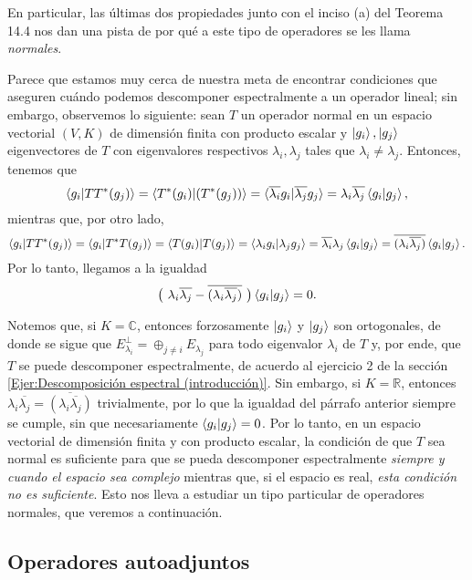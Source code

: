 \documentclass[12pt,dvipsnames]{article}
\begin{document}
En particular, las últimas dos propiedades junto con el inciso (a) del Teorema 14.4 nos dan una pista de por qué a este tipo de operadores se les llama \emph{normales}.

\vspace{3mm}
Parece que estamos muy cerca de nuestra meta de encontrar condiciones que aseguren cuándo podemos descomponer espectralmente a un operador lineal; sin embargo, observemos lo siguiente: sean $T$ un operador normal en un espacio vectorial $(V,K)$ de dimensión finita con producto escalar y $\ket{g_i},\ket{g_j}$ eigenvectores de $T$ con eigenvalores respectivos $\lambda_i, \lambda_j$ tales que $\lambda_i\neq \lambda_j$. Entonces, tenemos que 
$$\braket{g_i|TT^*(g_j)}=\braket{T^*(g_i)|(T^*(g_j))}=\braket{\overline{\lambda_i}g_i|\overline{\lambda_j}g_j}=\lambda_i \overline{\lambda_j}\braket{g_i|g_j},$$ 
mientras que, por otro lado, 
$$\braket{g_i|TT^*(g_j)}=\braket{g_i|T^*T(g_j)}=\braket{T(g_i)|T(g_j)}=\braket{\lambda_i g_i|\lambda_jg_j}=\overline{\lambda_i}\lambda_j\braket{g_i|g_j}=\overline{(\lambda_i \overline{\lambda_j})}\braket{g_i|g_j}.$$
Por lo tanto, llegamos a la igualdad
$$\big( \ \lambda_i \overline{\lambda_j} - \overline{(\lambda_i \overline{\lambda_j})} \ \big)\braket{g_i|g_j}=0.$$

Notemos que, si $K=\mathbb{C}$, entonces forzosamente $\ket{g_i}$ y $\ket{g_j}$ son ortogonales, de donde se sigue que $E_{\lambda_i}^\perp=\oplus_{j\neq i}E_{\lambda_j}$ para todo eigenvalor $\lambda_i$ de $T$ \textemdash y, por ende, que $T$ se puede descomponer espectralmente, de acuerdo al ejercicio 2 de la sección \ref{Ejer:Descomposición espectral (introducción)}. Sin embargo, si $K=\mathbb{R}$, entonces $\lambda_i \overline{\lambda_j} = \overline{(\lambda_i \overline{\lambda_j})}$ trivialmente, por lo que la igualdad del párrafo anterior siempre se cumple, sin que necesariamente $\braket{g_i|g_j}=0$. Por lo tanto, en un espacio vectorial de dimensión finita y con producto escalar, la condición de que $T$ sea normal es suficiente para que se pueda descomponer espectralmente \emph{siempre y cuando el espacio sea complejo} mientras que, si el espacio es real, \emph{esta condición no es suficiente}. Esto nos lleva a estudiar un tipo particular de operadores normales, que veremos a continuación.

\subsection{Operadores autoadjuntos} \label{Subsec:Operadores autoadjuntos}
\end{document}
